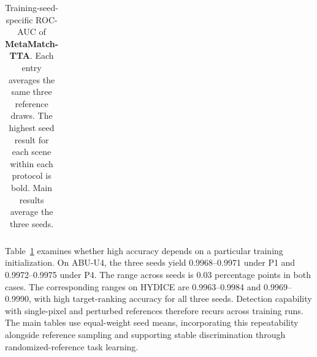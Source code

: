 \documentclass[a4paper,11pt]{article}
\renewcommand{\arraystretch}{1.18}
\newcommand{\method}{\textbf{MetaMatch-TTA}}
\begin{document}
\begin{table}[htbp]\centering\small\setlength{\tabcolsep}{4pt}
\renewcommand{\arraystretch}{1.02}
\caption{Training-seed-specific ROC-AUC of \textbf{\method{}}. Each entry averages the same three reference draws. The highest seed result for each scene within each protocol is bold. Main results average the three seeds.}\label{tab:seeds}
\begin{tabular}{lrrrrrr}\toprule\end{tabular}
\end{table}

Table~\ref{tab:seeds} examines whether high accuracy depends on a particular training initialization. On ABU-U4, the three seeds yield 0.9968--0.9971 under P1 and 0.9972--0.9975 under P4. The range across seeds is 0.03 percentage points in both cases. The corresponding ranges on HYDICE are 0.9963--0.9984 and 0.9969--0.9990, with high target-ranking accuracy for all three seeds. Detection capability with single-pixel and perturbed references therefore recurs across training runs. The main tables use equal-weight seed means, incorporating this repeatability alongside reference sampling and supporting stable discrimination through randomized-reference task learning.
\end{document}
